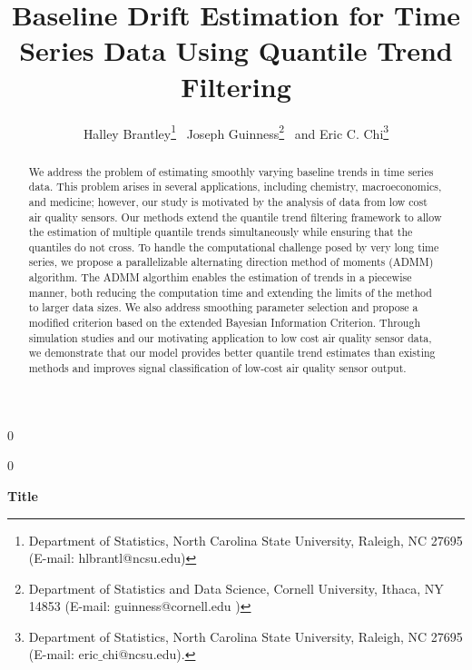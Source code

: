 \documentclass[12pt]{article}
\newcommand{\blind}{0}
\begin{document}

	\def\spacingset#1{\renewcommand{\baselinestretch}%
		{#1}\small\normalsize} \spacingset{1}



	\blind
	{
		\title{\bf Baseline Drift Estimation for Time Series Data Using Quantile Trend Filtering}
		\author{Halley Brantley\thanks{
				Department of Statistics, North Carolina State University, Raleigh, NC 27695 (E-mail: hlbrantl@ncsu.edu)} \,
			Joseph Guinness\thanks{
				Department of Statistics and Data Science, Cornell University, Ithaca, NY 14853 (E-mail: guinness@cornell.edu )} \,
			and
			Eric C. Chi\thanks{Department of Statistics, North Carolina State University, Raleigh, NC 27695 (E-mail: eric$\_$chi@ncsu.edu).}    \\}
		\date{}
		\maketitle
	} \fi

	\blind
	{
		\bigskip
		\bigskip
		\bigskip
		\begin{center}
			{\LARGE\bf Title}
		\end{center}
		\medskip
	} \fi

	\bigskip
	\begin{abstract}
		We address the problem of estimating smoothly varying baseline trends in time series data. This problem arises in several applications, including chemistry, macroeconomics, and medicine; however, our study is motivated by the analysis of data from low cost air quality sensors. Our methods extend the quantile trend filtering framework to allow the estimation of multiple quantile trends simultaneously while ensuring that the quantiles do not cross. To handle the computational challenge posed by very long time series, we propose a parallelizable alternating direction method of moments (ADMM) algorithm. The ADMM algorthim enables the estimation of trends in a piecewise manner, both reducing the computation time and extending the limits of the method to larger data sizes. We also address smoothing parameter selection and propose a modified criterion based on the extended Bayesian Information Criterion. Through simulation studies and our motivating application to low cost air quality sensor data, we demonstrate that our model provides better quantile trend estimates than existing methods and improves signal classification of low-cost air quality sensor output.
	\end{abstract}
\end{document}
